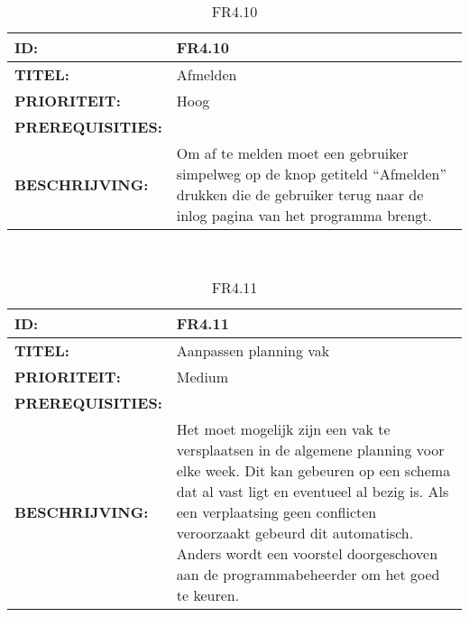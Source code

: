 \noindent\begin{table}[h]
            \begin{tabular}{l | p{10cm}}
                \textbf{ID:} & FR4.10 \\ \hline
                \textbf{TITEL:} & Afmelden\\ \hline
                \textbf{PRIORITEIT:} &  Hoog \\ \hline
                \textbf{PREREQUISITIES:} & \\ \hline
                \textbf{BESCHRIJVING:} & Om af te melden moet een gebruiker simpelweg op de knop getiteld “Afmelden” drukken die de gebruiker terug naar de inlog pagina van het programma brengt.\\
            \end{tabular}\\
            \caption{FR4.10}
            \label{tab:FR4.10}
        \end{table}
        
\noindent\begin{table}[h]
            \begin{tabular}{l | p{10cm}}
                \textbf{ID:} & FR4.11 \\ \hline
                \textbf{TITEL:} & Aanpassen planning vak\\ \hline
                \textbf{PRIORITEIT:} &  Medium \\ \hline
                \textbf{PREREQUISITIES:} & \\ \hline
                \textbf{BESCHRIJVING:} & Het moet mogelijk  zijn een vak te versplaatsen in de algemene planning voor elke week. Dit kan gebeuren op een schema dat al vast ligt en eventueel al bezig is. Als een verplaatsing geen conflicten veroorzaakt gebeurd dit automatisch. Anders wordt een voorstel doorgeschoven aan de programmabeheerder om het goed te keuren.\\
            \end{tabular}\\
            \caption{FR4.11}
            \label{tab:FR4.11}
        \end{table}
        
